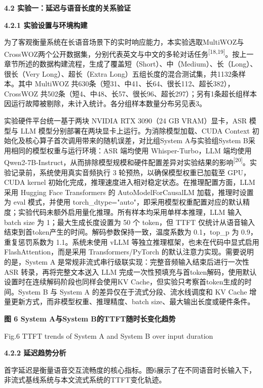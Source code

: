 \documentclass[
]{article}
\begin{document}
\textbf{4.2 实验一：延迟与语音长度的关系验证}

\textbf{4.2.1 实验设置与环境构建}

为了客观衡量系统在长语音场景下的实时响应能力，本实验选取MultiWOZ与CrossWOZ两个公开数据集，分别代表英文与中文的多轮对话任务\textsuperscript{{[}18,19{]}}。按上一章节所述的数据构建流程，生成了覆盖短（Short）、中（Medium）、长（Long）、很长（Very Long）、超长（Extra Long）五组长度的混合测试集，共1132条样本。其中 MultiWOZ 共630条（短31、中41、长64、很长112、超长382），CrossWOZ 共502条（短4、中48、长57、很长96、超长297）；另有1条超长组样本因运行故障被剔除，未计入统计。各分组样本数量分布另见表3。

实验硬件平台统一基于两块 NVIDIA RTX 3090（24 GB VRAM）显卡，ASR 模型与 LLM 模型分别部署在两块显卡上运行。为消除模型加载、CUDA Context 初始化及核心算子首次调用带来的随机误差，对比组System A与实验组System B采用相同的模型权重与运行环境：ASR 端均使用 Whisper-Turbo，LLM 端均使用 Qwen2-7B-Instruct，从而排除模型规模和硬件配置差异对实验结果的影响\textsuperscript{{[}20{]}}。实验记录前，系统使用真实音频执行 3 轮预热，以确保模型权重已加载至 GPU，CUDA kernel 初始化完成，推理速度进入相对稳定状态。在推理配置方面，LLM 采用 Hugging Face Transformers 的 AutoModelForCausalLM 加载，推理时设置为 eval 模式，并使用 torch\_dtype="auto"，即采用模型权重配置对应的默认精度；实验代码未额外启用量化推理。所有样本均采用单样本推理，LLM 输入 batch size 为 1；最大生成长度设置为 50 个 token，但 TTFT 仅统计从语音输入结束到首token产生的时间。解码参数保持一致，温度系数为 0.1，top\_p 为 0.9，重复惩罚系数为 1.1。系统未使用 vLLM 等独立推理框架，也未在代码中显式启用 FlashAttention，而是采用 Transformers/PyTorch 的默认注意力实现。需要说明的是，System A 是常规非流式串行级联实现：完整音频输入结束后进行一次性 ASR 转录，再将完整文本送入 LLM 完成一次性预填充与首token解码，使用默认设置时在连续解码阶段也同样会使用KV Cache，但实验只考察首token生成的时间。System B 与 System A 的差异仅在于流式分段、流水线调度和 KV Cache 增量更新方式，而非模型权重、推理精度、batch size、最大输出长度或硬件条件。



\textbf{图 6 System A与System B的TTFT随时长变化趋势}

Fig.6 TTFT trends of System A and System B over input duration

\textbf{4.2.2 延迟趋势分析}

首字延迟是衡量语音交互流畅度的核心指标。图6展示了在不同语音时长输入下，非流式基线系统与本文流式系统的TTFT变化轨迹。
\end{document}
